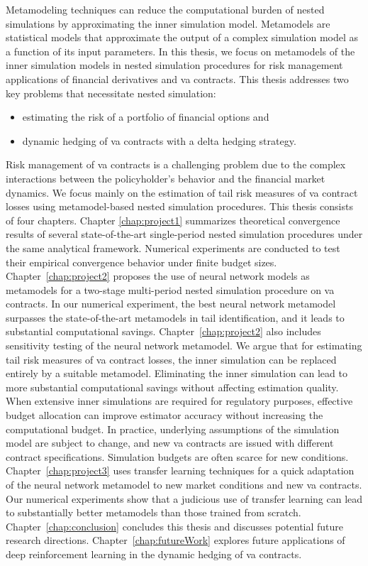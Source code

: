 Metamodeling techniques can reduce the computational burden of nested simulations by approximating the inner simulation model.
Metamodels are statistical models that approximate the output of a complex simulation model as a function of its input parameters.
In this thesis, we focus on metamodels of the inner simulation models in nested simulation procedures for risk management applications of financial derivatives and \gls{va} contracts.
This thesis addresses two key problems that necessitate nested simulation:
\begin{itemize}
    \item estimating the risk of a portfolio of financial options and 
    \item dynamic hedging of \gls{va} contracts with a delta hedging strategy.
\end{itemize}
Risk management of \gls{va} contracts is a challenging problem due to the complex interactions between the policyholder's behavior and the financial market dynamics.
We focus mainly on the estimation of tail risk measures of \gls{va} contract losses using metamodel-based nested simulation procedures.
This thesis consists of four chapters.
Chapter \ref{chap:project1} summarizes theoretical convergence results of several state-of-the-art single-period nested simulation procedures under the same analytical framework.
Numerical experiments are conducted to test their empirical convergence behavior under finite budget sizes.
Chapter~\ref{chap:project2} proposes the use of neural network models as metamodels for a two-stage multi-period nested simulation procedure on \gls{va} contracts.
In our numerical experiment, the best neural network metamodel surpasses the state-of-the-art metamodels in tail identification, and it leads to substantial computational savings.
Chapter~\ref{chap:project2} also includes sensitivity testing of the neural network metamodel.
We argue that for estimating tail risk measures of \gls{va} contract losses, the inner simulation can be replaced entirely by a suitable metamodel.
Eliminating the inner simulation can lead to more substantial computational savings without affecting estimation quality.
When extensive inner simulations are required for regulatory purposes, effective budget allocation can improve estimator accuracy without increasing the computational budget.
In practice, underlying assumptions of the simulation model are subject to change, and new \gls{va} contracts are issued with different contract specifications.
Simulation budgets are often scarce for new conditions.
Chapter~\ref{chap:project3} uses transfer learning techniques for a quick adaptation of the neural network metamodel to new market conditions and new \gls{va} contracts.
Our numerical experiments show that a judicious use of transfer learning can lead to substantially better metamodels than those trained from scratch.
Chapter~\ref{chap:conclusion} concludes this thesis and discusses potential future research directions.
Chapter~\ref{chap:futureWork} explores future applications of deep reinforcement learning in the dynamic hedging of \gls{va} contracts.

